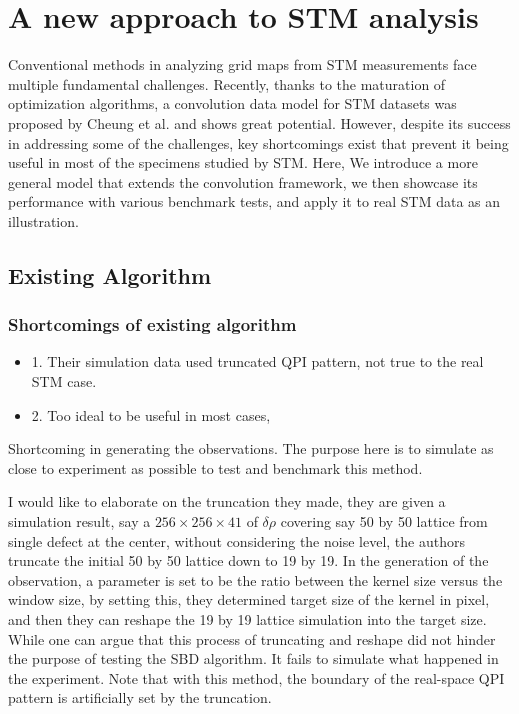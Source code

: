 \chapter{A new approach to STM analysis}
Conventional methods in analyzing grid maps from STM measurements face multiple fundamental  challenges. Recently, thanks to the maturation of optimization algorithms, a convolution data model for STM datasets was proposed by Cheung et al.\cite{cheungDictionaryLearningFouriertransform2020} and shows great potential. However,  despite its success in addressing some of the challenges, key shortcomings exist that prevent it being useful in most of the specimens studied by STM. Here, We introduce a more general model that extends the convolution framework, we then showcase its performance with various benchmark tests, and apply it to real STM data as an illustration.  







\section{Existing Algorithm}
\subsection{Shortcomings of existing algorithm}
\begin{itemize}
	\item 1. Their simulation data used truncated QPI pattern, not true to the real STM case. 
	\item 2. Too ideal to be useful in most cases,
\end{itemize}

Shortcoming in generating the observations. The purpose here is to simulate as close to experiment as possible to test and benchmark this method. 

I would like to elaborate on the truncation they made, they are given a simulation result, say a $256\times256\times41$ of $\delta\rho$ covering say 50 by 50 lattice from single defect at the center, without considering the noise level, the authors truncate the initial 50 by 50 lattice down to 19 by 19. In the generation of the observation, a parameter is set to be the ratio between the kernel size versus the window size, by setting this, they determined target size of the kernel in pixel, and then they can reshape the 19 by 19 lattice simulation into the target size. While one can argue that this process of truncating and reshape did not hinder the purpose of testing the SBD algorithm. It fails to simulate what happened in the experiment. Note that with this method, the boundary of the real-space QPI pattern is artificially set by the truncation.

